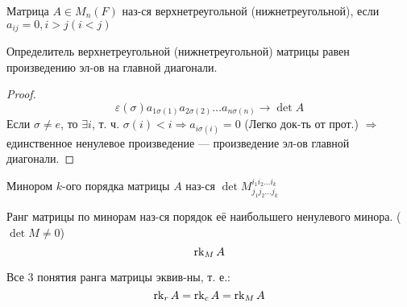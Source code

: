 \begin{definition}
Матрица $A \in M_n(F)$ наз-ся верхнетреугольной (нижнетреугольной), если $a_{ij} = 0, i > j (i < j)$
\end{definition}
\begin{statement}
Определитель верхнетреугольной (нижнетреугольной) матрицы равен произведению эл-ов на главной диагонали.
\end{statement}
\begin{proof}
  \[
  \varepsilon(\sigma) a_{1 \sigma(1)} a_{2 \sigma(2)} \ldots a_{n \sigma(n)} \rightarrow \det A
  \]
  Если $\sigma \neq e$, то $\exists i$, т. ч. $\sigma(i) < i \Rightarrow a_{i \sigma(i)} = 0$ (Легко док-ть от прот.) $\Rightarrow$ единственное ненулевое произведение --- произведение эл-ов главной диагонали.
\end{proof}
\begin{definition}
Минором $k$-ого порядка матрицы $A$ наз-ся $\det M_{j_1 j_2 \ldots j_k}^{i_1 i_2 \ldots i_k}$
\end{definition}
\begin{definition}
Ранг матрицы по минорам наз-ся порядок её наибольшего ненулевого минора. ($\det M \neq 0$)
\[
\operatorname{rk}_M A
\]
\end{definition}
\begin{theorem}[Фробениус, 1873-75 гг.]
\label{th:minor_rk_is_ok}
Все 3 понятия ранга матрицы эквив-ны, т. е.:
\[
\operatorname{rk}_r A = \operatorname{rk}_c A = \operatorname{rk}_M A
\]
\end{theorem}
